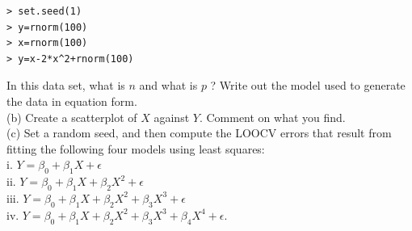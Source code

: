 \documentclass[10pt]{article}
\begin{document}
\begin{verbatim}
> set.seed(1)
> y=rnorm(100)
> x=rnorm(100)
> y=x-2*x^2+rnorm(100)
\end{verbatim}

In this data set, what is $n$ and what is $p$ ? Write out the model used to generate the data in equation form.\\
(b) Create a scatterplot of $X$ against $Y$. Comment on what you find.\\
(c) Set a random seed, and then compute the LOOCV errors that result from fitting the following four models using least squares:\\
i. $Y=\beta_{0}+\beta_{1} X+\epsilon$\\
ii. $Y=\beta_{0}+\beta_{1} X+\beta_{2} X^{2}+\epsilon$\\
iii. $Y=\beta_{0}+\beta_{1} X+\beta_{2} X^{2}+\beta_{3} X^{3}+\epsilon$\\
iv. $Y=\beta_{0}+\beta_{1} X+\beta_{2} X^{2}+\beta_{3} X^{3}+\beta_{4} X^{4}+\epsilon$.
\end{document}
